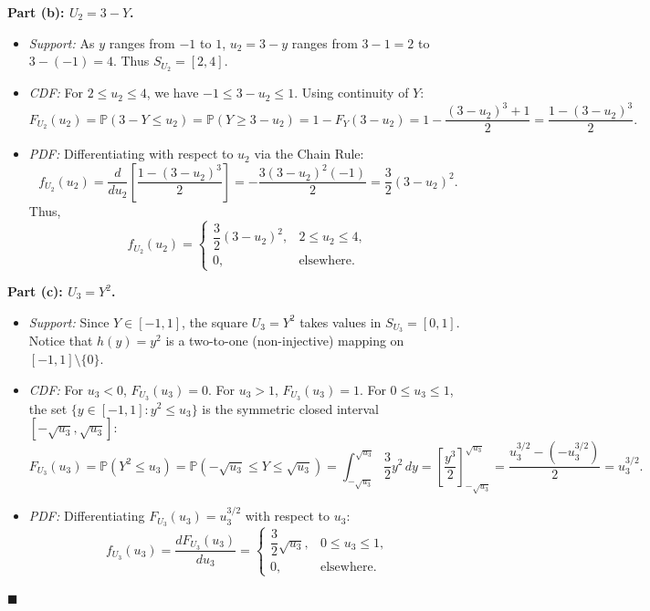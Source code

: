 \documentclass[11pt, letterpaper]{article}
\theoremstyle{definition}
\theoremstyle{remark}
\newcommand{\Prob}{\mathbb{P}}
\begin{document}
\textbf{Part (b): $U_2 = 3 - Y$.}
\begin{itemize}
    \item \textit{Support:} As $y$ ranges from $-1$ to $1$, $u_2 = 3 - y$ ranges from $3 - 1 = 2$ to $3 - (-1) = 4$. Thus $S_{U_2} = [2, 4]$.
    \item \textit{CDF:} For $2 \le u_2 \le 4$, we have $-1 \le 3 - u_2 \le 1$. Using continuity of $Y$:
    \[
        F_{U_2}(u_2) = \Prob(3 - Y \le u_2) = \Prob(Y \ge 3 - u_2) = 1 - F_Y(3 - u_2) = 1 - \frac{(3 - u_2)^3 + 1}{2} = \frac{1 - (3 - u_2)^3}{2}.
    \]
    \item \textit{PDF:} Differentiating with respect to $u_2$ via the Chain Rule:
    \[
        f_{U_2}(u_2) = \frac{d}{du_2}\left[\frac{1 - (3 - u_2)^3}{2}\right] = -\frac{3(3 - u_2)^2(-1)}{2} = \frac{3}{2}(3 - u_2)^2.
    \]
    Thus,
    \[
        f_{U_2}(u_2) = \begin{cases} \dfrac{3}{2}(3 - u_2)^2, & 2 \le u_2 \le 4, \\[6pt] 0, & \text{elsewhere.} \end{cases}
    \]
\end{itemize}

\textbf{Part (c): $U_3 = Y^2$.}
\begin{itemize}
    \item \textit{Support:} Since $Y \in [-1, 1]$, the square $U_3 = Y^2$ takes values in $S_{U_3} = [0, 1]$. Notice that $h(y) = y^2$ is a two-to-one (non-injective) mapping on $[-1, 1] \setminus \{0\}$.
    \item \textit{CDF:} For $u_3 < 0$, $F_{U_3}(u_3) = 0$. For $u_3 > 1$, $F_{U_3}(u_3) = 1$. For $0 \le u_3 \le 1$, the set $\{y \in [-1, 1] : y^2 \le u_3\}$ is the symmetric closed interval $[-\sqrt{u_3}, \sqrt{u_3}]$:
    \[
        F_{U_3}(u_3) = \Prob(Y^2 \le u_3) = \Prob(-\sqrt{u_3} \le Y \le \sqrt{u_3}) = \int_{-\sqrt{u_3}}^{\sqrt{u_3}} \frac{3}{2}y^2\,dy = \left[ \frac{y^3}{2} \right]_{-\sqrt{u_3}}^{\sqrt{u_3}} = \frac{u_3^{3/2} - (-u_3^{3/2})}{2} = u_3^{3/2}.
    \]
    \item \textit{PDF:} Differentiating $F_{U_3}(u_3) = u_3^{3/2}$ with respect to $u_3$:
    \[
        f_{U_3}(u_3) = \frac{dF_{U_3}(u_3)}{du_3} = \begin{cases} \dfrac{3}{2}\sqrt{u_3}, & 0 \le u_3 \le 1, \\[6pt] 0, & \text{elsewhere.} \end{cases}
    \]
\end{itemize}
\hfill $\blacksquare$

\end{document}
